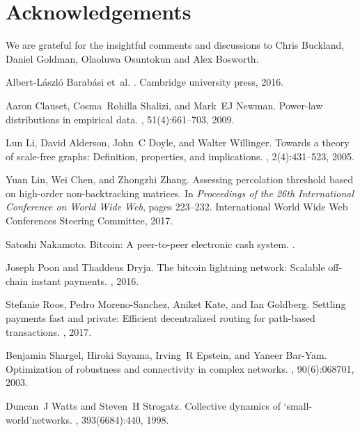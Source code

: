 \documentclass[runningheads]{llncs}
\begin{document}
\section{Acknowledgements}
We are grateful for the insightful comments and discussions to Chris Buckland, Daniel Goldman, Olaoluwa Osuntokun and Alex Bosworth.
%
%
%
% 
% 
%
\begin{thebibliography}{10}
	
	Albert-L{\'a}szl{\'o} Barab{\'a}si et~al.
	.
	\newblock Cambridge university press, 2016.
	
	Aaron Clauset, Cosma~Rohilla Shalizi, and Mark~EJ Newman.
	\newblock Power-law distributions in empirical data.
	, 51(4):661--703, 2009.
	
	Lun Li, David Alderson, John~C Doyle, and Walter Willinger.
	\newblock Towards a theory of scale-free graphs: Definition, properties, and
	implications.
	, 2(4):431--523, 2005.
	
	Yuan Lin, Wei Chen, and Zhongzhi Zhang.
	\newblock Assessing percolation threshold based on high-order non-backtracking
	matrices.
	\newblock In {\em Proceedings of the 26th International Conference on World
		Wide Web}, pages 223--232. International World Wide Web Conferences Steering
	Committee, 2017.
	
	Satoshi Nakamoto.
	\newblock Bitcoin: A peer-to-peer electronic cash system.
	.
	
	Joseph Poon and Thaddeus Dryja.
	\newblock The bitcoin lightning network: Scalable off-chain instant payments.
	,
	2016.
	
	Stefanie Roos, Pedro Moreno-Sanchez, Aniket Kate, and Ian Goldberg.
	\newblock Settling payments fast and private: Efficient decentralized routing
	for path-based transactions.
	, 2017.
	
	Benjamin Shargel, Hiroki Sayama, Irving~R Epstein, and Yaneer Bar-Yam.
	\newblock Optimization of robustness and connectivity in complex networks.
	, 90(6):068701, 2003.
	
	Duncan~J Watts and Steven~H Strogatz.
	\newblock Collective dynamics of ‘small-world’networks.
	, 393(6684):440, 1998.
	
\end{thebibliography}
\end{document}

